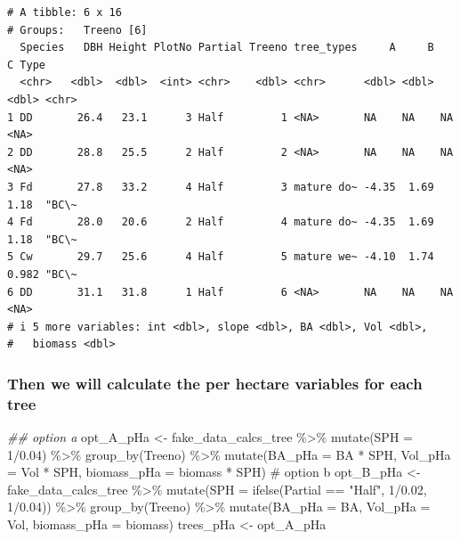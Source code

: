 \documentclass[
  letterpaper,
]{book}
\newenvironment{Shaded}{\begin{snugshade}}{\end{snugshade}}
\newcommand{\AttributeTok}[1]{\textcolor[rgb]{0.40,0.45,0.13}{#1}}
\newcommand{\CommentTok}[1]{\textcolor[rgb]{0.37,0.37,0.37}{#1}}
\newcommand{\DecValTok}[1]{\textcolor[rgb]{0.68,0.00,0.00}{#1}}
\newcommand{\DocumentationTok}[1]{\textcolor[rgb]{0.37,0.37,0.37}{\textit{#1}}}
\newcommand{\FloatTok}[1]{\textcolor[rgb]{0.68,0.00,0.00}{#1}}
\newcommand{\FunctionTok}[1]{\textcolor[rgb]{0.28,0.35,0.67}{#1}}
\newcommand{\NormalTok}[1]{\textcolor[rgb]{0.00,0.23,0.31}{#1}}
\newcommand{\OtherTok}[1]{\textcolor[rgb]{0.00,0.23,0.31}{#1}}
\newcommand{\SpecialCharTok}[1]{\textcolor[rgb]{0.37,0.37,0.37}{#1}}
\newcommand{\StringTok}[1]{\textcolor[rgb]{0.13,0.47,0.30}{#1}}
\begin{document}
\begin{verbatim}
# A tibble: 6 x 16
# Groups:   Treeno [6]
  Species   DBH Height PlotNo Partial Treeno tree_types     A     B      C Type 
  <chr>   <dbl>  <dbl>  <int> <chr>    <dbl> <chr>      <dbl> <dbl>  <dbl> <chr>
1 DD       26.4   23.1      3 Half         1 <NA>       NA    NA    NA      <NA>
2 DD       28.8   25.5      2 Half         2 <NA>       NA    NA    NA      <NA>
3 Fd       27.8   33.2      4 Half         3 mature do~ -4.35  1.69  1.18  "BC\~
4 Fd       28.0   20.6      2 Half         4 mature do~ -4.35  1.69  1.18  "BC\~
5 Cw       29.7   25.6      4 Half         5 mature we~ -4.10  1.74  0.982 "BC\~
6 DD       31.1   31.8      1 Half         6 <NA>       NA    NA    NA      <NA>
# i 5 more variables: int <dbl>, slope <dbl>, BA <dbl>, Vol <dbl>,
#   biomass <dbl>
\end{verbatim}

\hypertarget{then-we-will-calculate-the-per-hectare-variables-for-each-tree}{%
\subsubsection{Then we will calculate the per hectare variables for each
tree}\label{then-we-will-calculate-the-per-hectare-variables-for-each-tree}}

\begin{Shaded}
\begin{Highlighting}[]
\DocumentationTok{\#\# option a }
\NormalTok{opt\_A\_pHa }\OtherTok{\textless{}{-}}\NormalTok{ fake\_data\_calcs\_tree }\SpecialCharTok{\%\textgreater{}\%} 
  \FunctionTok{mutate}\NormalTok{(}\AttributeTok{SPH =} \DecValTok{1}\SpecialCharTok{/}\FloatTok{0.04}\NormalTok{) }\SpecialCharTok{\%\textgreater{}\%} 
  \FunctionTok{group\_by}\NormalTok{(Treeno) }\SpecialCharTok{\%\textgreater{}\%} 
  \FunctionTok{mutate}\NormalTok{(}\AttributeTok{BA\_pHa =}\NormalTok{ BA }\SpecialCharTok{*}\NormalTok{ SPH, }
         \AttributeTok{Vol\_pHa =}\NormalTok{ Vol }\SpecialCharTok{*}\NormalTok{ SPH, }
         \AttributeTok{biomass\_pHa =}\NormalTok{ biomass }\SpecialCharTok{*}\NormalTok{ SPH) }
\CommentTok{\# option b }
\NormalTok{opt\_B\_pHa }\OtherTok{\textless{}{-}}\NormalTok{ fake\_data\_calcs\_tree }\SpecialCharTok{\%\textgreater{}\%} 
  \FunctionTok{mutate}\NormalTok{(}\AttributeTok{SPH =} \FunctionTok{ifelse}\NormalTok{(Partial }\SpecialCharTok{==} \StringTok{"Half"}\NormalTok{, }\DecValTok{1}\SpecialCharTok{/}\FloatTok{0.02}\NormalTok{, }\DecValTok{1}\SpecialCharTok{/}\FloatTok{0.04}\NormalTok{)) }\SpecialCharTok{\%\textgreater{}\%} 
  \FunctionTok{group\_by}\NormalTok{(Treeno) }\SpecialCharTok{\%\textgreater{}\%} 
  \FunctionTok{mutate}\NormalTok{(}\AttributeTok{BA\_pHa =}\NormalTok{ BA, }
         \AttributeTok{Vol\_pHa =}\NormalTok{ Vol, }
         \AttributeTok{biomass\_pHa =}\NormalTok{ biomass)}
\NormalTok{trees\_pHa }\OtherTok{\textless{}{-}}\NormalTok{ opt\_A\_pHa}
\end{Highlighting}
\end{Shaded}
\end{document}
